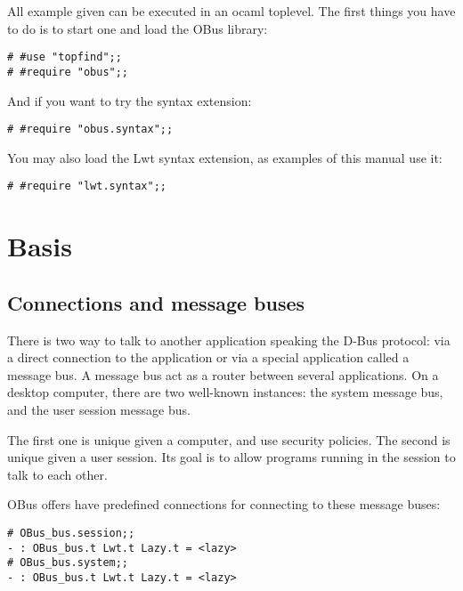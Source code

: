 \documentclass{article}
\begin{document}
All example given can be executed in an ocaml toplevel. The first
things you have to do is to start one and load the OBus library:

\begin{verbatim}
# #use "topfind";;
# #require "obus";;
\end{verbatim}

And if you want to try the syntax extension:

\begin{verbatim}
# #require "obus.syntax";;
\end{verbatim}

You may also load the Lwt syntax extension, as examples of this manual
use it:

\begin{verbatim}
# #require "lwt.syntax";;
\end{verbatim}

\section{Basis}

\subsection{Connections and message buses}

There is two way to talk to another application speaking the D-Bus
protocol: via a direct connection to the application or via a special
application called a message bus. A message bus act as a router
between several applications. On a desktop computer, there are two
well-known instances: the system message bus, and the user session
message bus.

The first one is unique given a computer, and use security
policies. The second is unique given a user session. Its goal is to
allow programs running in the session to talk to each other.

OBus offers have predefined connections for connecting to these
message buses:

\begin{verbatim}
# OBus_bus.session;;
- : OBus_bus.t Lwt.t Lazy.t = <lazy>
# OBus_bus.system;;
- : OBus_bus.t Lwt.t Lazy.t = <lazy>
\end{verbatim}
\end{document}
